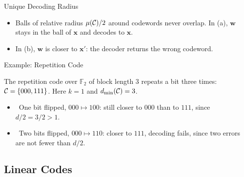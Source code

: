\documentclass{zkdl-presentation-template}
\begin{document}
\begin{frame}{Unique Decoding Radius}
\begin{figure}
{%
            }
        \end{figure}
        \vspace{-5pt}
        \begin{itemize}
            \item<1-> Balls of relative radius $\mu(\mathcal{C})/2$ around codewords never overlap. In (a), $\mathbf{w}$ stays in the ball of $\mathbf{x}$ and decodes to $\mathbf{x}$.
            \item<2-> In (b), $\mathbf{w}$ is closer to $\mathbf{x}'$: the decoder returns the wrong codeword.
        \end{itemize}
    \end{frame}

    \begin{frame}{Example: Repetition Code}
        \begin{example}
            The repetition code over $\mathbb{F}_2$ of block length $3$ repeats a bit three times: $\mathcal{C}=\{000, 111\}$. Here $k=1$ and $d_{\min}(\mathcal{C})=3$.
        \end{example}
        \pause

        \begin{itemize}
            \item \cmark\ One bit flipped, $000 \mapsto 100$: still closer to $000$ than to $111$, since $d/2 = 3/2 > 1$.\pause
            \item \xmark\ Two bits flipped, $000 \mapsto 110$: closer to $111$, decoding fails, since two errors are not fewer than $d/2$.
        \end{itemize}
    \end{frame}

    \subsection{Linear Codes}
\end{document}
